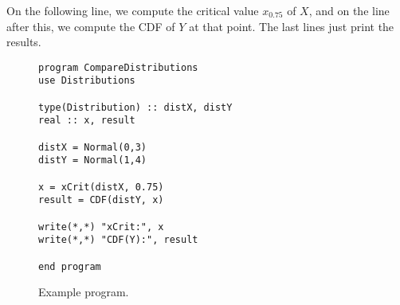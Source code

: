 \documentclass[a4paper]{article}
\begin{document}
On the following line, we compute the critical value $x_{0.75}$ of $X$, and on the line after this, we compute the CDF of $Y$ at that point. The last lines just print the results.

\begin{figure}
\begin{verbatim}
program CompareDistributions
use Distributions

type(Distribution) :: distX, distY
real :: x, result

distX = Normal(0,3)
distY = Normal(1,4)

x = xCrit(distX, 0.75)
result = CDF(distY, x)

write(*,*) "xCrit:", x
write(*,*) "CDF(Y):", result

end program

\end{verbatim}
\caption{Example program.}
\end{figure}
\end{document}
